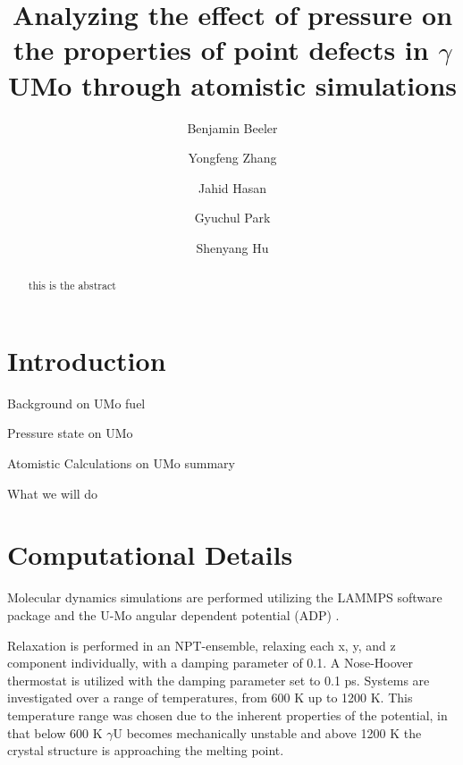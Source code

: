 \documentclass[11pt, oneside]{elsarticle}   	%
\date{}							%
\begin{document}
\begin{frontmatter}

\title{Analyzing the effect of pressure on the properties of point defects in $\gamma$UMo through atomistic simulations}

\author[ncsu,inl]{Benjamin Beeler}
\author[wisc]{Yongfeng Zhang}
\author[ncsu]{Jahid Hasan}
\author[purdue]{Gyuchul Park}
\author[pnnl]{Shenyang Hu}
\address[ncsu]{North Carolina State University, Raleigh, NC 27695}
\address[inl]{Idaho National Laboratory, Idaho Falls, ID 83415}
\address[wisc]{University of Wisconsin-Madison, Madison, WI 53715}
\address[purdue]{Purdue University, XXXXX}
\address[pnnl]{Pacific Northwest National Laboratory, Idaho Falls, ID 83415}



\begin{abstract}
this is the abstract
\end{abstract}

\end{frontmatter}


\section{Introduction}

Background on UMo fuel

Pressure state on UMo

Atomistic Calculations on UMo summary

What we will do

\section{Computational Details}
Molecular dynamics simulations are performed utilizing the LAMMPS \cite{plimpton1995} software package and the U-Mo angular dependent potential (ADP) \cite{smirnovaADP}. 





Relaxation is performed in an NPT-ensemble, relaxing each x, y, and z component individually, with a damping parameter of 0.1. A Nose-Hoover thermostat is utilized with the damping parameter set to 0.1 ps. Systems are investigated over a range of temperatures, from 600 K up to 1200 K. This temperature range was chosen due to the inherent properties of the potential, in that below 600 K $\gamma$U becomes mechanically unstable and above 1200 K the crystal structure is approaching the melting point. 
\end{document}
